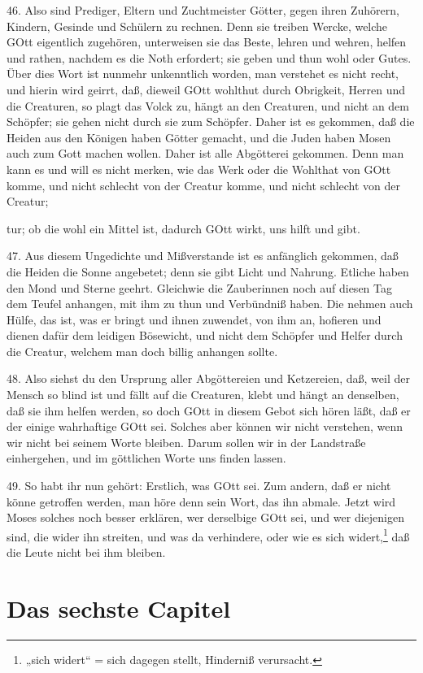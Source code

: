 46. Also sind Prediger, Eltern und Zuchtmeister Götter, gegen ihren Zuhörern, Kindern, Gesinde und Schülern zu rechnen. Denn sie treiben Wercke, welche GOtt eigentlich zugehören, unterweisen sie das Beste, lehren und wehren, helfen und rathen, nachdem es die Noth erfordert; sie geben und thun wohl oder Gutes. Über dies Wort ist nunmehr unkenntlich worden, man verstehet es nicht recht, und hierin wird geirrt, daß, dieweil GOtt wohlthut durch Obrigkeit, Herren und die Creaturen, so plagt das Volck zu, hängt an den Creaturen, und nicht an dem Schöpfer; sie gehen nicht durch sie zum Schöpfer. Daher ist es gekommen, daß die Heiden aus den Königen haben Götter gemacht, und die Juden haben Mosen auch zum Gott machen wollen. Daher ist alle Abgötterei gekommen. Denn man kann es und will es nicht merken, wie das Werk oder die Wohlthat von GOtt komme, und nicht schlecht von der Creatur komme, und nicht schlecht von der Creatur;

tur; ob die wohl ein Mittel ist, dadurch GOtt wirkt, uns hilft und gibt.

47. Aus diesem Ungedichte und Mißverstande ist es anfänglich gekommen, daß die Heiden die Sonne angebetet; denn sie gibt Licht und Nahrung. Etliche haben den Mond und Sterne geehrt. Gleichwie die Zauberinnen noch auf diesen Tag dem Teufel anhangen, mit ihm zu thun und Verbündniß haben. Die nehmen auch Hülfe, das ist, was er bringt und ihnen zuwendet, von ihm an, hofieren und dienen dafür dem leidigen Bösewicht, und nicht dem Schöpfer und Helfer durch die Creatur, welchem man doch billig anhangen sollte.

48. Also siehst du den Ursprung aller Abgöttereien und Ketzereien, daß, weil der Mensch so blind ist und fällt auf die Creaturen, klebt und hängt an denselben, daß sie ihm helfen werden, so doch GOtt in diesem Gebot sich hören läßt, daß er der einige wahrhaftige GOtt sei. Solches aber können wir nicht verstehen, wenn wir nicht bei seinem Worte bleiben. Darum sollen wir in der Landstraße einhergehen, und im göttlichen Worte uns finden lassen.

49. So habt ihr nun gehört: Erstlich, was GOtt sei. Zum andern, daß er nicht könne getroffen werden, man höre denn sein Wort, das ihn abmale. Jetzt wird Moses solches noch besser erklären, wer derselbige GOtt sei, und wer diejenigen sind, die wider ihn streiten, und was da verhindere, oder wie es sich widert,\footnote{„sich widert“ = sich dagegen stellt, Hinderniß verursacht.} daß die Leute nicht bei ihm bleiben.

\section{Das sechste Capitel}


